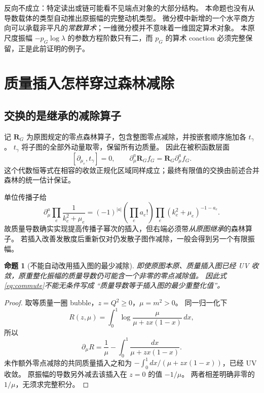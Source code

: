 \documentclass[11pt,a4paper]{ctexart}
\theoremstyle{cnplain}
\newtheorem{proposition}[theorem]{命题}
\theoremstyle{remark}\newtheorem{remark}[theorem]{注}
\begin{document}
反向不成立：特定读出或链可能看不见端点对象的大部分结构。
本命题也没有从导数载体的类型自动推出原振幅的完整动机类型。
微分模中新增的一个水平商方向可以承载非平凡的\emph{常数算术}；一维微分模并不意味着一维固定算术对象。
本原尺度振幅 $-p_G\log\lambda$ 的参数方程阶数只有二，而 $p_G$ 的算术 coaction 必须完整保留，正是此前证明的例子。

\section{质量插入怎样穿过森林减除}
\subsection{交换的是继承的减除算子}
记 $\mathbf R_G$ 为原图规定的零点森林算子，包含整图零点减除，并按嵌套顺序施加各 $t_\gamma$。
$t_\gamma$ 将子图的全部外动量取零，保留所有边质量。
因此在被积函数层面
\begin{equation}\label{eq:commute}
 [\partial_{\mu_e},t_\gamma]=0,\qquad
 \partial_\mu^a\mathbf R_G f_G
                =\mathbf R_G\partial_\mu^a f_G.
\end{equation}
这个代数恒等式在相容的收敛正规化区域同样成立；最终有限值的交换由前述合并森林的统一估计保证。

单位传播子给
\begin{equation}\label{eq:insert}
 \partial_\mu^a\prod_e\frac1{k_e^2+\mu_e}
 =(-1)^{|a|}\left(\prod_e a_e!\right)
              \prod_e(k_e^2+\mu_e)^{-1-a_e}.
\end{equation}
故质量导数确实实现提高传播子幂次的插入，但右端必须带\emph{从原图继承}的森林算子。
若插入改善发散度后重新仅对仍发散子图作减除，一般会得到另一个有限振幅。

\begin{proposition}[不能自动改用插入图的最少减除]\label{prop:oversub}
即使原图本原、质量插入图已经 UV 收敛，原重整化振幅的质量导数仍可能含一个非零的零点减除值。
因此式\eqref{eq:commute}不能无条件写成 ``质量导数等于插入图的最少重整化值''。
\end{proposition}
\begin{proof}
取等质量一圈 bubble，$z=Q^2\geq0$，$\mu=m^2>0$。
同一归一化下
\[
 R(z,\mu)=\int_0^1\log\frac{\mu}{\mu+zx(1-x)}\,dx,
\]
所以
\begin{equation}\label{eq:bubble}
 \partial_\mu R
   =\frac1\mu-\int_0^1\frac{dx}{\mu+zx(1-x)}.
\end{equation}
未作额外零点减除的共同质量插入之和为
$-\int_0^1dx/(\mu+zx(1-x))$，已经 UV 收敛。
原振幅的导数另外减去该插入在 $z=0$ 的值 $-1/\mu$。
两者相差明确非零的 $1/\mu$，无须求完整积分。
\end{proof}
\end{document}
